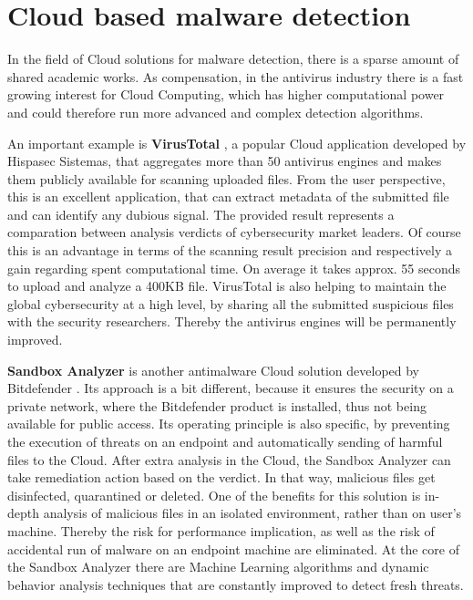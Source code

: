 \section{Cloud based malware detection}
\label{section:relatedWorkCloud}
In the field of Cloud solutions for malware detection, there is a sparse amount of shared academic works. As compensation, in the antivirus industry there is a fast growing interest for Cloud Computing, which has higher computational power and could therefore run more advanced and complex detection algorithms. \par
An important example is \textbf{VirusTotal} \cite{virustotal}, a popular Cloud application developed by Hispasec Sistemas, that aggregates more than 50 antivirus engines and makes them publicly available for scanning uploaded files. From the user perspective, this is an excellent application, that can extract metadata of the submitted file and can identify any dubious signal. The provided result represents a comparation between analysis verdicts of cybersecurity market leaders. Of course this is an advantage in terms of the scanning result precision and respectively a gain regarding spent computational time. On average it takes approx. 55 seconds to upload and analyze a 400KB file. VirusTotal is also helping to maintain the global cybersecurity at a high level, by sharing all the submitted suspicious files with the security researchers. Thereby the antivirus engines will be permanently improved. \par
\textbf{Sandbox Analyzer} is another antimalware Cloud solution developed by Bitdefender \cite{bdSandbox}. Its approach is a bit different, because it
ensures the security on a private network, where the Bitdefender product is installed, thus not being available for public access. Its operating principle is also specific, by preventing the execution of threats on an endpoint and automatically sending of harmful files to the Cloud. After extra analysis in the Cloud, the Sandbox Analyzer can take remediation action based on the verdict. In that way, malicious files get disinfected, quarantined or deleted. One of the benefits for this solution is in-depth analysis of malicious files in an isolated environment, rather than on user's machine. Thereby the risk for performance implication, as well as the risk of accidental run of malware on an endpoint machine are eliminated. At the core of the Sandbox Analyzer there are Machine Learning algorithms and dynamic behavior analysis techniques that are constantly improved to detect fresh threats.

